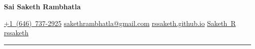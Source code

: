 \documentclass[10pt, letterpaper]{article}
\newenvironment{header}{
        \setlength{\topsep}{0pt}\par\kern\topsep\centering\color{primaryColor}\linespread{1.5}
    }{
        \par\kern\topsep
    } %
\newcommand{\placelastupdatedtext}{%
  \AddToShipoutPictureFG*{%
    \put(
        \LenToUnit{\paperwidth-2 cm-0.2 cm+0.05cm},
        \LenToUnit{\paperheight-1.0 cm}
    )
  }%
}%
\let\hrefWithoutArrow\href
\begin{document}
    \placelastupdatedtext
    \begin{header}
        \fontsize{24 pt}{24 pt}
        \textbf{Sai Saketh Rambhatla}

        \vspace{0.3 cm}

        \normalsize
        \mbox{\hrefWithoutArrow{tel:+1(646)7372925}{{\footnotesize\faPhone*}\hspace*{0.13cm}+1 (646) 737-2925}}
        \hspace*{0.5 cm}
        \mbox{\hrefWithoutArrow{mailto:sakethrambhatla@gmail.com}{{\small\faEnvelope[regular]}\hspace*{0.13cm}sakethrambhatla@gmail.com}}
        \hspace*{0.5 cm}
        \mbox{\hrefWithoutArrow{https://rssaketh.github.io/}{{\small\faLink}\hspace*{0.13cm}rssaketh.github.io}}
        \hspace*{0.5 cm}
        \mbox{\hrefWithoutArrow{https://scholar.google.com/citations?user=VRyNTogAAAAJ&hl=en}{{\small\faGraduationCap}\hspace*{0.13cm}Saketh R}}
        \hspace*{0.5 cm}
        \mbox{\hrefWithoutArrow{https://www.linkedin.com/in/rssaketh/}{{\small\faLinkedinIn}\hspace*{0.13cm}rssaketh}}
    \end{header}
    {\color{primaryColor!40}\rule{\textwidth}{0.4pt}}

    \vspace{0.3 cm}



\end{document}
